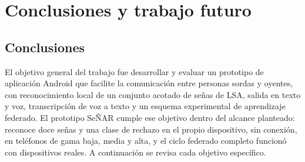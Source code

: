 \chapter{Conclusiones y trabajo futuro}
\label{cap:conclusiones}

\section{Conclusiones}

El objetivo general del trabajo fue desarrollar y evaluar un prototipo de aplicación Android que facilite la comunicación entre personas sordas y oyentes, con reconocimiento local de un conjunto acotado de señas de LSA, salida en texto y voz, transcripción de voz a texto y un esquema experimental de aprendizaje federado. El prototipo SeÑAR cumple ese objetivo dentro del alcance planteado: reconoce doce señas y una clase de rechazo en el propio dispositivo, sin conexión, en teléfonos de gama baja, media y alta, y el ciclo federado completo funcionó con dispositivos reales. A continuación se revisa cada objetivo específico.

